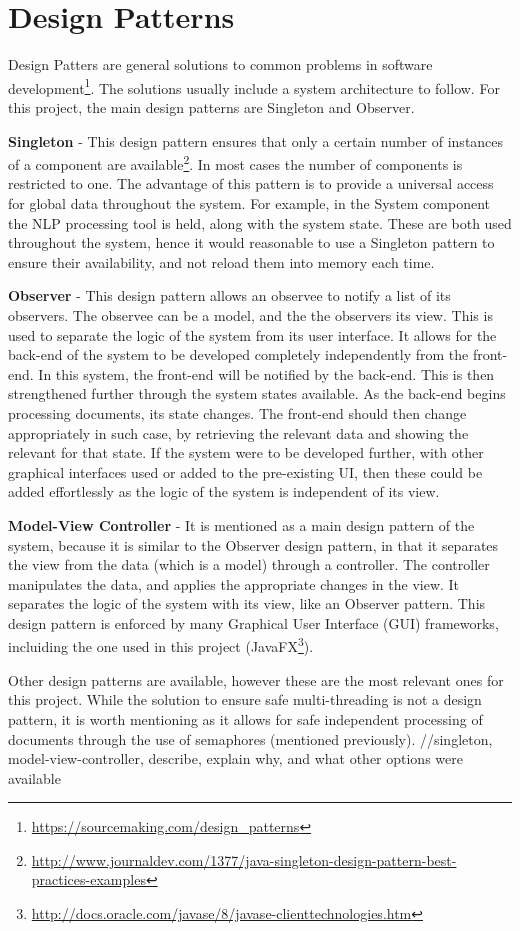 \section{Design Patterns}
\par Design Patters are general solutions to common problems in software development\footnote{\url{https://sourcemaking.com/design_patterns}}. The solutions usually include a system architecture to follow. For this project, the main design patterns are Singleton and Observer.
\par \textbf{Singleton} - This design pattern ensures that only a certain number of instances of a component are available\footnote{\url{http://www.journaldev.com/1377/java-singleton-design-pattern-best-practices-examples}}. In most cases the number of components is restricted to one. The advantage of this pattern is to provide a universal access for global data throughout the system. For example, in the System component the NLP processing tool is held, along with the system state. These are both used throughout the system, hence it would reasonable to use a Singleton pattern to ensure their availability, and not reload them into memory each time.
\par \textbf{Observer} - This design pattern allows an observee to notify a list of its observers. The observee can be a model, and the the observers its view. This is used to separate the logic of the system from its user interface. It allows for the back-end of the system to be developed completely independently from the front-end. In this system, the front-end will be notified by the back-end. This is then strengthened further through the system states available. As the back-end begins processing documents, its state changes. The front-end should then change appropriately in such case, by retrieving the relevant data and showing the relevant for that state. If the system were to be developed further, with other graphical interfaces used or added to the pre-existing UI, then these could be added effortlessly as the logic of the system is independent of its view.
\par \textbf{Model-View Controller} - It is mentioned as a main design pattern of the system, because it is similar to the Observer design pattern, in that it separates the view from the data (which is a model) through a controller. The controller manipulates the data, and applies the appropriate changes in the view. It separates the logic of the system with its view, like an Observer pattern. This design pattern is enforced by many Graphical User Interface (GUI) frameworks, incluiding the one used in this project (JavaFX\footnote{\url{http://docs.oracle.com/javase/8/javase-clienttechnologies.htm}}). 
\par Other design patterns are available, however these are the most relevant ones for this project. While the solution to ensure safe multi-threading is not a design pattern, it is worth mentioning as it allows for safe independent processing of documents through the use of semaphores (mentioned previously). 
//singleton, model-view-controller, describe, explain why, and what other options were available
